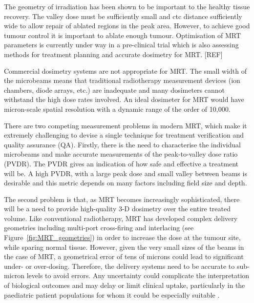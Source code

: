 	The geometry of irradiation has been shown to be important to the healthy tissue recovery. The valley dose must be sufficiently small and ctc distance sufficiently wide to allow repair of ablated regions in the peak area. However, to achieve good tumour control it is important to ablate enough tumour. Optimisation of MRT parameters is currently under way in a pre-clinical trial which is also assessing methods for treatment planning and accurate dosimetry for MRT. [REF]
	
	
	
	Commercial dosimetry systems are not appropriate for MRT. 	The small width of the microbeams means that traditional radiotherapy measurement devices (ion chambers, diode arrays, etc.) are inadequate and many dosimeters cannot withstand the high dose rates involved. An ideal dosimeter for MRT would have micron-scale spatial resolution with a dynamic range of the order of 10,000.

    There are two competing measurement problems in modern MRT, which make it extremely challenging to devise a single technique for treatment verification and quality assurance (QA). Firstly, there is the need to characterise the individual microbeams and make accurate measurements of the peak-to-valley dose ratio (PVDR). The PVDR gives an indication of how safe and effective a treatment will be. A high PVDR, with a large peak dose and small valley between beams is desirable and this metric	depends on many factors including field size and depth. 

	The second problem is that, as MRT becomes increasingly sophisticated, there will be a need to provide high-quality 3-D dosimetry over the entire treated volume. Like conventional radiotherapy, MRT has developed complex delivery geometries including multi-port cross-firing \cite{brauer-krischnew2005} and interlacing \cite{brauer2013preclinical, serduc2009first,serduchigh-precision2010} (see Figure~\ref{fig:MRT_geometries}) in order to increase the dose at the tumour site, while sparing normal tissue. However, given the very small sizes of the beams in the case of MRT, a geometrical error of tens of microns could lead to significant under- or over-dosing. Therefore, the delivery systems need to be accurate to sub-micron levels to avoid errors. %
	Any uncertainty could complicate the interpretation of biological outcomes and may delay or limit clinical uptake, particularly in the paediatric patient populations for whom it could be especially suitable \cite{laissue2001weanling}.
		
